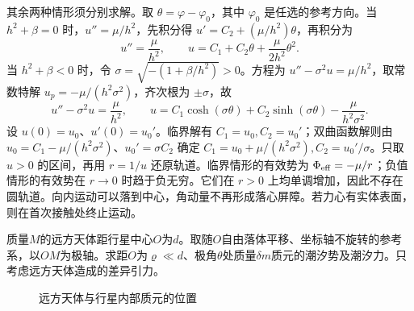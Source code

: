\begin{solution}
其余两种情形须分别求解。取 $\theta=\varphi-\varphi_0$，其中 $\varphi_0$ 是任选的参考方向。当 $h^2+\beta=0$ 时，$u''=\mu/h^2$，先积分得 $u'=C_2+(\mu/h^2)\theta$，再积分为
\[
 u''=\frac\mu{h^2},\qquad
 \boxed{u=C_1+C_2\theta+\frac\mu{2h^2}\theta^2}.
\]
当 $h^2+\beta<0$ 时，令 $\sigma=\sqrt{-(1+\beta/h^2)}>0$。方程为 $u''-\sigma^2u=\mu/h^2$，取常数特解 $u_p=-\mu/(h^2\sigma^2)$，齐次根为 $\pm\sigma$，故
\[
 u''-\sigma^2u=\frac\mu{h^2},\qquad
 \boxed{u=C_1\cosh(\sigma\theta)+C_2\sinh(\sigma\theta)
       -\frac\mu{h^2\sigma^2}}.
\]
设 $u(0)=u_0$、$u'(0)=u_0'$。临界解有 $C_1=u_0,C_2=u_0'$；双曲函数解则由 $u_0=C_1-\mu/(h^2\sigma^2)$、$u_0'=\sigma C_2$ 确定 $C_1=u_0+\mu/(h^2\sigma^2),C_2=u_0'/\sigma$。只取 $u>0$ 的区间，再用 $r=1/u$ 还原轨道。临界情形的有效势为 $\Phi_{\rm eff}=-\mu/r$；负值情形的有效势在 $r\to0$ 时趋于负无穷。它们在 $r>0$ 上均单调增加，因此不存在圆轨道。向内运动可以落到中心，角动量不再形成落心屏障。若力心有实体表面，则在首次接触处终止运动。
\end{solution}



\begin{example}[潮汐势与潮汐力]\label{ex:hw8-7}

质量$M$的远方天体距行星中心$O$为$d$。取随$O$自由落体平移、坐标轴不旋转的参考系，以$OM$为极轴。求距$O$为$\varrho\ll d$、极角$\theta$处质量$\delta m$质元的潮汐势及潮汐力。只考虑远方天体造成的差异引力。

\end{example}


\begin{figure}[H]\centering
{}
\caption{远方天体与行星内部质元的位置}\label{fig:hw8-7-q}
\end{figure}

